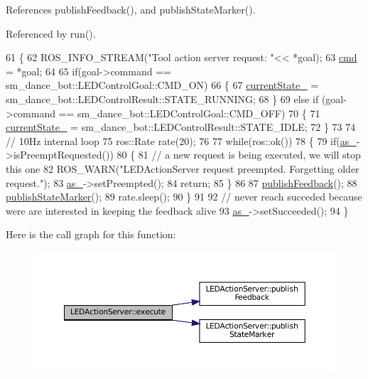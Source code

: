 References publish\+Feedback(), and publish\+State\+Marker().



Referenced by run().


\begin{DoxyCode}
61 \{
62   ROS\_INFO\_STREAM(\textcolor{stringliteral}{"Tool action server request: "}<< *goal);
63   \hyperlink{classLEDActionServer_a4d3a4c07e7659cdd78228932bb1634d3}{cmd} = *goal;
64 
65   \textcolor{keywordflow}{if}(goal->command == sm\_dance\_bot::LEDControlGoal::CMD\_ON)
66   \{
67     \hyperlink{classLEDActionServer_a1dc456e987dc331501ad6ff2215661ff}{currentState\_} =  sm\_dance\_bot::LEDControlResult::STATE\_RUNNING;
68   \}
69   \textcolor{keywordflow}{else}  \textcolor{keywordflow}{if} (goal->command == sm\_dance\_bot::LEDControlGoal::CMD\_OFF)
70   \{
71     \hyperlink{classLEDActionServer_a1dc456e987dc331501ad6ff2215661ff}{currentState\_} =  sm\_dance\_bot::LEDControlResult::STATE\_IDLE;
72   \}
73 
74   \textcolor{comment}{// 10Hz internal loop}
75   ros::Rate rate(20);
76 
77   \textcolor{keywordflow}{while}(ros::ok())
78   \{
79     \textcolor{keywordflow}{if}(\hyperlink{classLEDActionServer_a61d21c77642081acf017d4ebd65b2de0}{as\_}->isPreemptRequested())
80     \{
81        \textcolor{comment}{// a new request is being executed, we will stop this one}
82        ROS\_WARN(\textcolor{stringliteral}{"LEDActionServer request preempted. Forgetting older request."});
83        \hyperlink{classLEDActionServer_a61d21c77642081acf017d4ebd65b2de0}{as\_}->setPreempted(); 
84        \textcolor{keywordflow}{return};
85     \}
86     
87     \hyperlink{classLEDActionServer_a25c93d4e7ecdacbb4f5b090d7789aa36}{publishFeedback}();
88     \hyperlink{classLEDActionServer_a73bb754ac2347c50660624ad92315895}{publishStateMarker}();
89     rate.sleep();
90   \}
91 
92    \textcolor{comment}{// never reach succeded because were are interested in keeping the feedback alive}
93    \hyperlink{classLEDActionServer_a61d21c77642081acf017d4ebd65b2de0}{as\_}->setSucceeded();
94 \}
\end{DoxyCode}
Here is the call graph for this function\+:
\nopagebreak
\begin{figure}[H]
\begin{center}
\leavevmode
\includegraphics[width=350pt]{classLEDActionServer_a2d8b9dfca1912e24170ef69a5edf5e9b_cgraph}
\end{center}
\end{figure}
